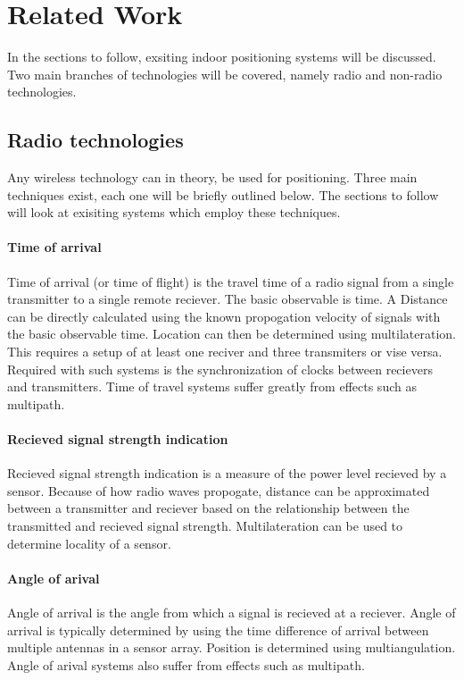 \section{Related Work}
In the sections to follow, exsiting indoor positioning systems will be discussed. Two main branches of technologies will be covered, namely radio and non-radio technologies.

\subsection{Radio technologies}
Any wireless technology can in theory, be used for positioning. Three main techniques exist, each one will be briefly outlined below. The sections to follow will look at exisiting systems which employ these techniques.

\paragraph{Time of arrival}
Time of arrival (or time of flight) is the travel time of a radio signal from a single transmitter to a single remote reciever. The basic observable is time. A Distance can be directly calculated using the known propogation velocity of signals with the basic observable time. Location can then be determined using multilateration. This requires a setup of at least one reciver and three transmiters or vise versa.
Required with such systems is the synchronization of clocks between recievers and transmitters.
Time of travel systems suffer greatly from effects such as multipath.
\cite{k._pahlavan_wideband_1998}

\paragraph{Recieved signal strength indication}
Recieved signal strength indication is a measure of the power level recieved by a sensor. Because of how radio waves propogate, distance can be approximated between a transmitter and reciever based on the relationship between the transmitted and recieved signal strength. Multilateration can be used to determine locality of a sensor.

\paragraph{Angle of arival}
Angle of arrival is the angle from which a signal is recieved at a reciever. Angle of arrival is typically determined by using the time difference of arrival between multiple antennas in a sensor array. Position is determined using multiangulation.
Angle of arival systems also suffer from effects such as multipath.

